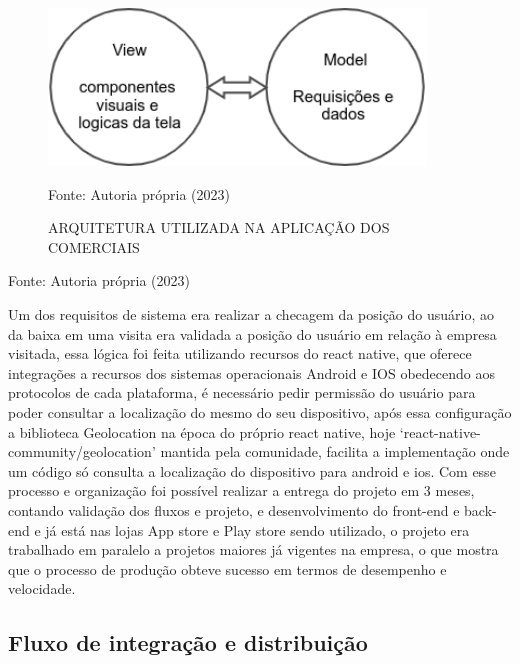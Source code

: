 \documentclass{ufersa}
\begin{document}
\begin{figure}[h]
\centering 
\caption{ARQUITETURA UTILIZADA NA APLICAÇÃO DOS COMERCIAIS}
\hspace*{-1.5in}

\includegraphics[width=10cm]{assets/arquiteturaSimples.png} 

Fonte: Autoria própria (2023)
\end{figure}


Fonte: Autoria própria (2023)


Um dos requisitos de sistema era realizar a checagem da posição do usuário, ao da baixa em uma visita era validada a posição do usuário em relação à empresa visitada, essa lógica foi feita utilizando recursos do react native, que oferece integrações a recursos dos sistemas operacionais Android e IOS obedecendo aos protocolos de cada plataforma, é necessário pedir permissão do usuário para poder consultar a localização do mesmo do seu dispositivo, após essa configuração a biblioteca  Geolocation na época do próprio react native, hoje ‘react-native-community/geolocation’ mantida pela comunidade, facilita a implementação onde um código só consulta a localização do dispositivo para android e ios. Com esse processo e organização foi possível realizar a entrega do projeto em 3 meses, contando validação dos fluxos e projeto, e desenvolvimento do front-end e back-end e já está nas lojas App store e Play store sendo utilizado, o projeto era trabalhado em paralelo a projetos maiores já vigentes na empresa, o que mostra que o processo de produção obteve sucesso em termos de desempenho e velocidade.

\subsection{Fluxo de integração e distribuição}
\end{document}
